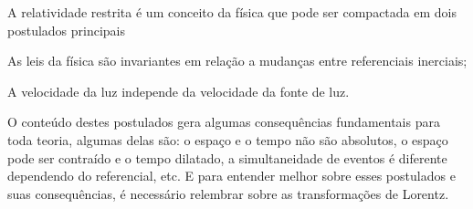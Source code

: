 A relatividade restrita é um conceito da física que pode ser compactada em dois postulados principais
    \begin{myitemize}
        \item As leis da física são invariantes em relação a mudanças entre referenciais inerciais;
        \item A velocidade da luz independe da velocidade da fonte de luz.
    \end{myitemize}

O conteúdo destes postulados gera algumas consequências fundamentais para toda teoria, algumas delas são: o espaço e o tempo não são absolutos, o espaço pode ser contraído e o tempo dilatado, a simultaneidade de eventos é diferente dependendo do referencial, etc. E para entender melhor sobre esses postulados e suas consequências, é necessário relembrar sobre as transformações de Lorentz.